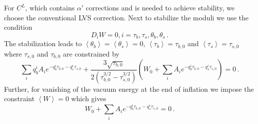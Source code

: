 \documentclass[12pt]{article}
\begin{document}
For $C^L$, which contains $\alpha'$ corrections and is needed to achieve stability, we choose the conventional LVS correction.
Next to stabilize the moduli we use the condition
\begin{equation}
  D_i W = 0, i = \tau_b, \tau_s, \theta_b, \theta_s\,.
\end{equation}
The stabilization leads to $\left<\theta_b\right> = \left<\theta_s\right> = 0$, $\left<\tau_b\right> = \tau_{b, 0}$ and $\left<\tau_s\right> = \tau_{s, 0}$ where $\tau_{s, 0}$ and $\tau_{b, 0}$ are constrained by
\begin{equation} \label{eq:LVS:stabilization}
  \sum_i q^i_b A_i e^{-q_b^i \tau_{b, 0} - q^i_s \tau_{s, 0}}
  + \frac{3 \sqrt{\tau_{b, 0}}}{2 \left(\tau^{3 / 2}_{b, 0} - \tau^{3 / 2}_{s, 0}\right)} \left(
    W_0 + \sum_i A_i e^{-q^i_b \tau_{b, 0} - q_s^i \tau_{s, 0}}
  \right) = 0\,.
\end{equation}
Further, for vanishing of the vacuum energy at the end of inflation we impose the constraint $\left<W\right> = 0$ which gives
\begin{equation}
  W_0 + \sum_i A_i e^{-q_b^i \tau_{b, 0} - q_s^i \tau_{s, 0}} = 0\,.
\end{equation}

\end{document}
